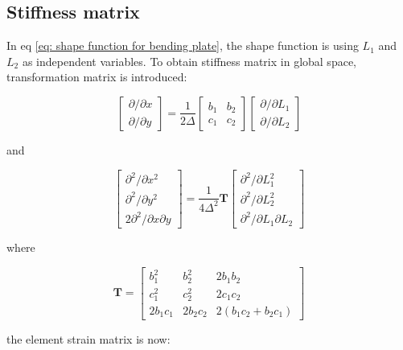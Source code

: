 \subsection{Stiffness matrix}
In eq \ref{eq: shape function for bending plate}, the shape function is using $ L_1 $ and $ L_2 $ as independent variables. To obtain stiffness matrix in global space, transformation matrix is introduced:

\begin{equation}\label{key}
\begin{bmatrix}
\partial / \partial x \\ 
\partial / \partial y
\end{bmatrix} = \frac{1}{2\Delta} \begin{bmatrix}
b_1 & b_2 \\ 
c_1 & c_2
\end{bmatrix} \begin{bmatrix}
\partial / \partial L_1 \\ 
\partial / \partial L_2
\end{bmatrix} 
\end{equation}

 and 
 
 \begin{equation}\label{key}
 \begin{bmatrix}
 \partial^2 / \partial x^2 \\ 
 \partial^2 / \partial y^2 \\
2 \partial^2 / \partial x \partial y
 \end{bmatrix} = \frac{1}{4\Delta^2} \mathbf{T} \begin{bmatrix}
 \partial^2 / \partial L_1^2 \\ 
 \partial^2 / \partial L_2^2 \\
 \partial^2 / \partial L_1 \partial L_2
 \end{bmatrix} 
 \end{equation}

where

\begin{equation}\label{key}
\mathbf{T} = \begin{bmatrix}
b_1^2 & b_2^2 & 2 b_1 b_2 \\ 
c_1^2 & c_2^2 & 2 c_1 c_2 \\ 
2 b_1 c_1 & 2 b_2 c_2 & 2 ( b_1 c_2 + b_2 c_1)
\end{bmatrix} 
\end{equation}

the element strain matrix is now:

